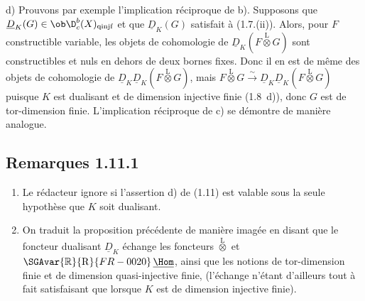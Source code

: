 d)
Prouvons par exemple l'implication réciproque de b). Supposons que $\underline{D}_K(G) \in \ob \D_c^{b}(X)_{\mathrm{qinjf}}$ et que $\underline{D}_K(G)$ satisfait à (1.7.(ii)). Alors, pour $F$ constructible variable, les objets de cohomologie de $\underline{D}_K(F \mathop{\otimes}\limits^{\mathrm{L}} G)$ sont constructibles et nuls en dehors de deux bornes fixes. Donc il en est de même des objets de cohomologie de $\underline{D}_K \underline{D}_K(F \mathop{\otimes}\limits^{\mathrm{L}} G)$, mais $F \mathop{\otimes}\limits^{\mathrm{L}} G \xrightarrow{\sim} \underline{D}_K \underline{D}_K(F \mathop{\otimes}\limits^{\mathrm{L}} G)$ puisque $K$ est dualisant et de dimension injective finie (1.8~d)), donc $G$ est de tor-dimension finie. L'implication réciproque de c) se démontre de manière analogue.

\subsection*{Remarques 1.11.1}
\begin{enumerate}
\item[a)] Le rédacteur ignore si l'assertion d) de (1.11) est valable sous la seule hypothèse que $K$ soit dualisant.
\item[b)] On traduit la proposition précédente de manière imagée en disant que le foncteur dualisant $\underline{D}_K$ échange les foncteurs $\mathop{\otimes}\limits^{\mathrm{L}}$ et $\SGAvar{\mathbb{R}}{\mathrm{R}}{FR-0020}\,\underline{\Hom}$, ainsi que les notions de tor-dimension finie et de dimension quasi-injective finie, (l'échange n'étant d'ailleurs tout à fait satisfaisant que lorsque $K$ est de dimension injective finie).
\end{enumerate}

